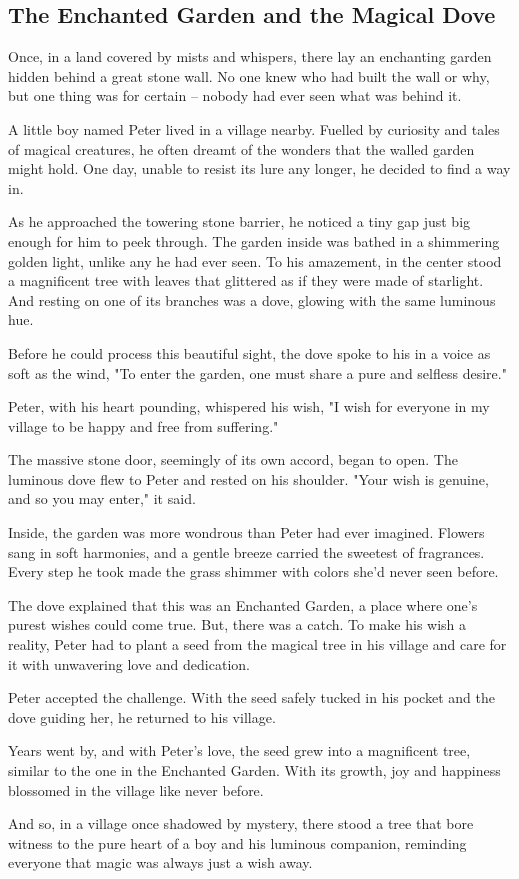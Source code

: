 \documentclass[10pt, a4paper, titlepage]{article}
\begin{document}
\subsection{The Enchanted Garden and the Magical Dove}

Once, in a land covered by mists and whispers, there lay an enchanting garden hidden behind a great stone wall. No one knew who had built the wall or why, but one thing was for certain – nobody had ever seen what was behind it.

A little boy named Peter lived in a village nearby. Fuelled by curiosity and tales of magical creatures, he often dreamt of the wonders that the walled garden might hold. One day, unable to resist its lure any longer, he decided to find a way in.

As he approached the towering stone barrier, he noticed a tiny gap just big enough for him to peek through. The garden inside was bathed in a shimmering golden light, unlike any he had ever seen. To his amazement, in the center stood a magnificent tree with leaves that glittered as if they were made of starlight. And resting on one of its branches was a dove, glowing with the same luminous hue.

Before he could process this beautiful sight, the dove spoke to his in a voice as soft as the wind, "To enter the garden, one must share a pure and selfless desire."

Peter, with his heart pounding, whispered his wish, "I wish for everyone in my village to be happy and free from suffering."

The massive stone door, seemingly of its own accord, began to open. The luminous dove flew to Peter and rested on his shoulder. "Your wish is genuine, and so you may enter," it said.

Inside, the garden was more wondrous than Peter had ever imagined. Flowers sang in soft harmonies, and a gentle breeze carried the sweetest of fragrances. Every step he took made the grass shimmer with colors she'd never seen before.

The dove explained that this was an Enchanted Garden, a place where one’s purest wishes could come true. But, there was a catch. To make his wish a reality, Peter had to plant a seed from the magical tree in his village and care for it with unwavering love and dedication.

Peter accepted the challenge. With the seed safely tucked in his pocket and the dove guiding her, he returned to his village.

Years went by, and with Peter's love, the seed grew into a magnificent tree, similar to the one in the Enchanted Garden. With its growth, joy and happiness blossomed in the village like never before.

And so, in a village once shadowed by mystery, there stood a tree that bore witness to the pure heart of a boy and his luminous companion, reminding everyone that magic was always just a wish away.
\end{document}
